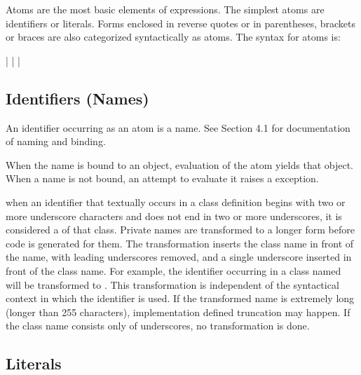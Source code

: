 Atoms are the most basic elements of expressions.  The simplest atoms
are identifiers or literals.  Forms enclosed in
reverse quotes or in parentheses, brackets or braces are also
categorized syntactically as atoms.  The syntax for atoms is:

\begin{productionlist}
             { |  | }
             { | }
\end{productionlist}


\subsection{Identifiers (Names)\label{atom-identifiers}}

An identifier occurring as an atom is a name.  See Section 4.1 for
documentation of naming and binding.

When the name is bound to an object, evaluation of the atom yields
that object.  When a name is not bound, an attempt to evaluate it
raises a  exception.

%
%
%
when an identifier that textually occurs in a class definition begins
with two or more underscore characters and does not end in two or more
underscores, it is considered a  of that class.
Private names are transformed to a longer form before code is
generated for them.  The transformation inserts the class name in
front of the name, with leading underscores removed, and a single
underscore inserted in front of the class name.  For example, the
identifier  occurring in a class named  will be
transformed to .  This transformation is independent
of the syntactical context in which the identifier is used.  If the
transformed name is extremely long (longer than 255 characters),
implementation defined truncation may happen.  If the class name
consists only of underscores, no transformation is done.


\subsection{Literals\label{atom-literals}}

